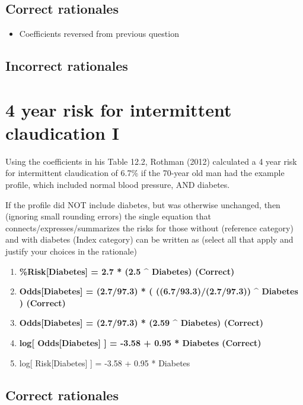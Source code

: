 \documentclass[letterpaper,9pt,twoside,printwatermark=false]{pinp}
\providecommand{\tightlist}{%
  \setlength{\itemsep}{0pt}\setlength{\parskip}{0pt}}
\begin{document}
\subsection{Correct rationales}\label{correct-rationales-6}

\begin{itemize}
\tightlist
\item
  Coefficients reversed from previous question
\end{itemize}

\subsection{Incorrect rationales}\label{incorrect-rationales-6}

\section{4 year risk for intermittent claudication
I}\label{year-risk-for-intermittent-claudication-i}

Using the coefficients in his Table 12.2, Rothman (2012) calculated a 4
year risk for intermittent claudication of 6.7\% if the 70-year old man
had the example profile, which included normal blood pressure, AND
diabetes.

If the profile did NOT include diabetes, but was otherwise unchanged,
then (ignoring small rounding errors) the single equation that
connects/expresses/summarizes the risks for those without (reference
category) and with diabetes (Index category) can be written as (select
all that apply and justify your choices in the rationale)

\begin{enumerate}
\def\labelenumi{\alph{enumi}.}
\tightlist
\item
  \textbf{\%Risk{[}Diabetes{]} = 2.7 * (2.5 \^{} Diabetes) (Correct)}
\item
  \textbf{Odds{[}Diabetes{]} = (2.7/97.3) * ( ((6.7/93.3)/(2.7/97.3))
  \^{} Diabetes ) (Correct)}
\item
  \textbf{Odds{[}Diabetes{]} = (2.7/97.3) * (2.59 \^{} Diabetes)
  (Correct)}
\item
  \textbf{log{[} Odds{[}Diabetes{]} {]} = -3.58 + 0.95 * Diabetes
  (Correct)}
\item
  log{[} Risk{[}Diabetes{]} {]} = -3.58 + 0.95 * Diabetes
\end{enumerate}

\subsection{Correct rationales}\label{correct-rationales-7}
\end{document}
